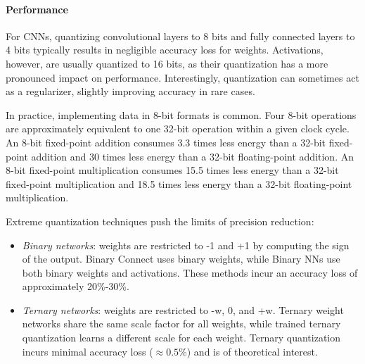 \paragraph*{Performance}
For CNNs, quantizing convolutional layers to 8 bits and fully connected layers to 4 bits typically results in negligible accuracy loss for weights. 
Activations, however, are usually quantized to 16 bits, as their quantization has a more pronounced impact on performance. 
Interestingly, quantization can sometimes act as a regularizer, slightly improving accuracy in rare cases.

In practice, implementing data in 8-bit formats is common.
Four 8-bit operations are approximately equivalent to one 32-bit operation within a given clock cycle.
An 8-bit fixed-point addition consumes 3.3 times less energy than a 32-bit fixed-point addition and 30 times less energy than a 32-bit floating-point addition.
An 8-bit fixed-point multiplication consumes 15.5 times less energy than a 32-bit fixed-point multiplication and 18.5 times less energy than a 32-bit floating-point multiplication.

Extreme quantization techniques push the limits of precision reduction:
\begin{itemize}
    \item \textit{Binary networks}: weights are restricted to -1 and +1 by computing the sign of the output. 
        Binary Connect uses binary weights, while Binary NNs use both binary weights and activations. 
        These methods incur an accuracy loss of approximately 20\%-30\%.
    \item \textit{Ternary networks}: weights are restricted to -w, 0, and +w. 
        Ternary weight networks share the same scale factor for all weights, while trained ternary quantization learns a different scale for each weight. 
        Ternary quantization incurs minimal accuracy loss ($\approx0.5\%$) and is of theoretical interest.
\end{itemize}


